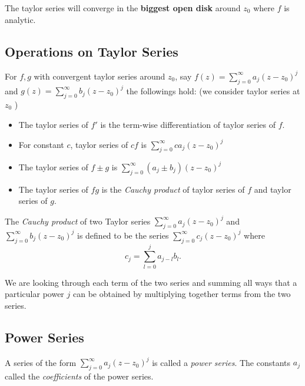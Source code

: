 \begin{remark}
	The taylor series will converge in the \textbf{biggest open disk} around $z_0$ where $f$ is analytic.
\end{remark}

\subsection{Operations on Taylor Series}

\begin{theorem}
	For $f,g$ with convergent taylor series around $z_0$, say $f(z) = \sum_{j=0}^{\infty} a_j (z-z_0)^j$ and $g(z) = \sum_{j=0}^{\infty} b_j (z-z_0)^j$ the followings hold: (we consider taylor series at $z_0$ )
	\begin{itemize}
		\item The taylor series of $f'$ is the term-wise differentiation of taylor series of $f$.
		\item For constant $c$, taylor series of $cf$ is $\sum_{j=0}^{\infty} ca_j(z-z_0)^j$
		\item The taylor series of $f \pm g$ is $\sum_{j=0}^{\infty} (a_j \pm b_j) (z-z_0)^j$ 
		\item The taylor series of $fg$ is the \textit{Cauchy product} of taylor series of $f$ and taylor series of $g$.
	\end{itemize}
\end{theorem}

\begin{definition}
	The \textit{Cauchy product} of two Taylor series $\sum_{j=0}^{\infty} a_j (z-z_0)^j$ and $\sum_{j=0}^{\infty} b_j (z-z_0)^j$ is defined to be the series $\sum_{j=0}^{\infty } c_j(z-z_0)^j$ where
	\[
		c_j = \sum_{l=0}^{j} a_{j-l}b_l
	.\] 
\end{definition}
\begin{intuition}
	We are looking through each term of the two series and summing all ways that a particular power $j$ can be obtained by multiplying together terms from the two series.
\end{intuition}

\subsection{Power Series}

\begin{definition}
	A series of the form $\sum_{j=0}^{\infty } a_j(z - z_0)^j$ is called a  \textit{power series}. The constants  $a_j$ called the \textit{coefficients} of the power series.
\end{definition}


